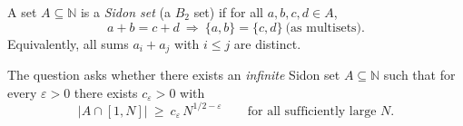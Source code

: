 A set $A\subseteq\mathbb N$ is a \emph{Sidon set} (a $B_2$ set) if for all $a,b,c,d\in A$,
\[
 a+b=c+d\ \Longrightarrow\ \{a,b\}=\{c,d\}\ \text{(as multisets)}.
\]
Equivalently, all sums $a_i+a_j$ with $i\le j$ are distinct.

The question asks whether there exists an \emph{infinite} Sidon set $A\subseteq\mathbb N$ such that for every $\varepsilon>0$ there exists $c_{\varepsilon}>0$ with
\[
|A\cap[1,N]|\ \ge\ c_{\varepsilon}\,N^{1/2-\varepsilon}\qquad\text{for all sufficiently large }N.
\]
